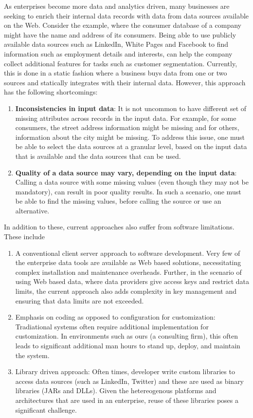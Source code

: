 As enterprises become more data and analytics driven, many businesses are seeking to enrich their internal data records with data from data sources available on the Web. Consider the example, where the consumer database of a company might have the name and address of its consumers.  Being able to use publicly available data sources such as LinkedIn, White Pages and Facebook to find information such as employment details and interests, can help the company collect additional features for tasks such as customer segmentation. Currently, this is done in a static fashion where a business buys data from one or two sources and statically integrates with their internal data. However, this approach has the following shortcomings:
\begin{enumerate}
  \item \textbf{Inconsistencies in input data}: It is not uncommon to have different set of missing attributes across records in the input data. For example, for some consumers, the street address information might be missing and for others, information about the city might be missing. To address this issue, one must be able to select the data sources at a granular level, based on the input data that is available and the data sources that can be used.
   \item \textbf{Quality of a data source may vary, depending on the input data}: Calling a data source with some missing values (even though they may not be mandatory), can result in poor quality results. In such a scenario, one must be able to find the missing values, before calling the source or use an alternative.
\end{enumerate}
In addition to these, current approaches also suffer from software limitations. These include
\begin{enumerate}
	\item A conventional client server approach to software development. Very few of the enterprise data tools are available as Web based solutions, necessitating complex installation and maintenance overheads. Further, in the 
scenario of using Web based data, where data providers give access keys and restrict data limits, the current approach also adds complexity in key management and ensuring that data limits are not exceeded. 
	\item Emphasis on coding as opposed to configuration for customization: Tradiational systems often require additional implementation for customization. In environments such as ours (a consulting firm), this often leads to 
significant additional man hours to stand up, deploy, and maintain the system. 
	\item Library driven approach: Often times, developer write custom libraries to access data sources (such as LinkedIn, Twitter) and these are used as binary libraries (JARs and DLLs). Given the hetereogenous platforms and 
architectures that are used in an enterprise, reuse of these libraries poses a significant challenge. 
\end{enumerate}


